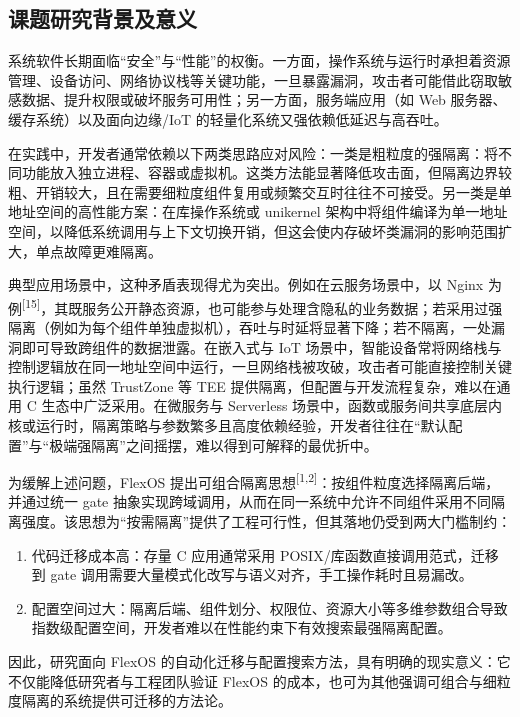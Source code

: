 \documentclass[UTF8,a4paper,12pt,twoside]{ctexart}  %
\begin{document}
\subsection{课题研究背景及意义}

系统软件长期面临``安全''与``性能''的权衡。一方面，操作系统与运行时承担着资源管理、设备访问、网络协议栈等关键功能，一旦暴露漏洞，攻击者可能借此窃取敏感数据、提升权限或破坏服务可用性；另一方面，服务端应用（如
Web 服务器、缓存系统）以及面向边缘/IoT
的轻量化系统又强依赖低延迟与高吞吐。

在实践中，开发者通常依赖以下两类思路应对风险：一类是粗粒度的强隔离：将不同功能放入独立进程、容器或虚拟机。这类方法能显著降低攻击面，但隔离边界较粗、开销较大，且在需要细粒度组件复用或频繁交互时往往不可接受。另一类是单地址空间的高性能方案：在库操作系统或
unikernel
架构中将组件编译为单一地址空间，以降低系统调用与上下文切换开销，但这会使内存破坏类漏洞的影响范围扩大，单点故障更难隔离。

典型应用场景中，这种矛盾表现得尤为突出。例如在云服务场景中，以 Nginx
为例\textsuperscript{[15]}，其既服务公开静态资源，也可能参与处理含隐私的业务数据；若采用过强隔离（例如为每个组件单独虚拟机），吞吐与时延将显著下降；若不隔离，一处漏洞即可导致跨组件的数据泄露。在嵌入式与
IoT
场景中，智能设备常将网络栈与控制逻辑放在同一地址空间中运行，一旦网络栈被攻破，攻击者可能直接控制关键执行逻辑；虽然
TrustZone 等 TEE 提供隔离，但配置与开发流程复杂，难以在通用 C
生态中广泛采用。在微服务与 Serverless
场景中，函数或服务间共享底层内核或运行时，隔离策略与参数繁多且高度依赖经验，开发者往往在``默认配置''与``极端强隔离''之间摇摆，难以得到可解释的最优折中。

为缓解上述问题，FlexOS
提出可组合隔离思想\textsuperscript{[1,2]}：按组件粒度选择隔离后端，并通过统一
gate
抽象实现跨域调用，从而在同一系统中允许不同组件采用不同隔离强度。该思想为``按需隔离''提供了工程可行性，但其落地仍受到两大门槛制约：
\begin{enumerate}
\def\labelenumi{\arabic{enumi}.}
\item
  代码迁移成本高：存量 C 应用通常采用
  POSIX/库函数直接调用范式，迁移到 gate
  调用需要大量模式化改写与语义对齐，手工操作耗时且易漏改。
\item
  配置空间过大：隔离后端、组件划分、权限位、资源大小等多维参数组合导致指数级配置空间，开发者难以在性能约束下有效搜索最强隔离配置。
\end{enumerate}

因此，研究面向 FlexOS
的自动化迁移与配置搜索方法，具有明确的现实意义：它不仅能降低研究者与工程团队验证
FlexOS
的成本，也可为其他强调可组合与细粒度隔离的系统提供可迁移的方法论。
\end{document}
